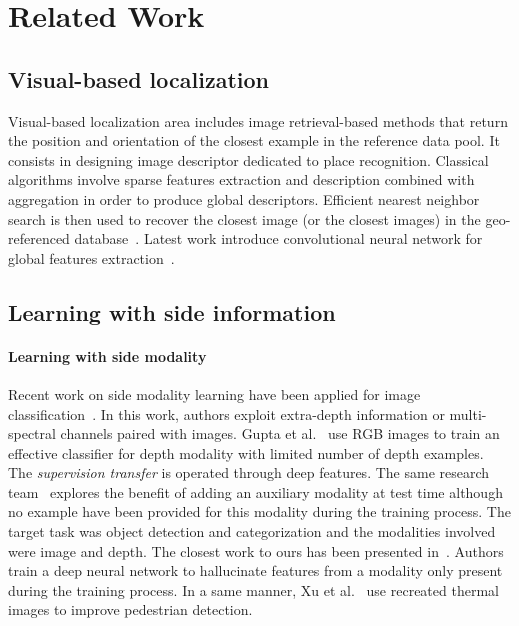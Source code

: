 \section{Related Work}
\label{sec:related_work}

\subsection{Visual-based localization}\label{se:soa_VBL}
Visual-based localization area includes image retrieval-based methods that return the position and orientation of the closest example in the reference data pool. It consists in designing image descriptor dedicated to place recognition. Classical algorithms involve sparse features extraction and description combined with aggregation in order to produce global descriptors. Efficient nearest neighbor search is then used to recover the closest image (or the closest images) in the geo-referenced database~\cite{Arandjelovic2014,Torii2015}. Latest work introduce convolutional neural network for global features extraction~\cite{Arandjelovic2017,Kim2017a,Gordo2017,Radenovic2017,Sunderhauf2015a}.

\subsection{Learning with side information}\label{se:soa_side}
\paragraph{Learning with side modality} Recent work on side modality learning have been applied for image classification~\cite{Zhang2014}. In this work, authors exploit extra-depth information or multi-spectral channels paired with images. Gupta et al.~\cite{Gupta2016a} use RGB images to train an effective classifier for depth modality with limited number of depth examples. The \textit{supervision transfer} is operated through deep features. The same research team~\cite{Hoffman2016a} explores the benefit of adding an auxiliary modality at test time although no example have been provided for this modality during the training process. The target task was object detection and categorization and the modalities involved were image and depth. The closest work to ours has been presented in~\cite{Hoffman2016}. Authors train a deep neural network to hallucinate features from a modality only present during the training process. In a same manner, Xu et al.~\cite{xu2017learning} use recreated thermal images to improve pedestrian detection.

